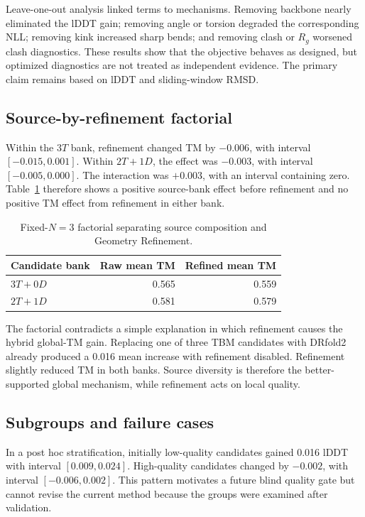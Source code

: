 \documentclass[12pt,a4paper,oneside]{report}
\begin{document}
Leave-one-out analysis linked terms to mechanisms. Removing backbone nearly eliminated
the lDDT gain; removing angle or torsion degraded the corresponding NLL; removing kink
increased sharp bends; and removing clash or $R_g$ worsened clash diagnostics. These
results show that the objective behaves as designed, but optimized diagnostics are not
treated as independent evidence. The primary claim remains based on lDDT and
sliding-window RMSD.

\subsection{Source-by-refinement factorial}

Within the $3T$ bank, refinement changed TM by $-0.006$, with interval
$[-0.015,0.001]$. Within $2T+1D$, the effect was $-0.003$, with interval
$[-0.005,0.000]$. The interaction was $+0.003$, with an interval containing
zero. Table~\ref{tab:factorial_en} therefore shows a positive source-bank effect before
refinement and no positive TM effect from refinement in either bank.

\begin{table}[H]
\centering
\caption{Fixed-$N=3$ factorial separating source composition and Geometry Refinement.}
\label{tab:factorial_en}
\begin{tabular}{lrr}
\toprule
Candidate bank & Raw mean TM & Refined mean TM \\
\midrule
$3T+0D$ & 0.565 & 0.559 \\
$2T+1D$ & 0.581 & 0.579 \\
\bottomrule
\end{tabular}
\end{table}

The factorial contradicts a simple explanation in which refinement causes the hybrid
global-TM gain. Replacing one of three TBM candidates with DRfold2 already produced a
0.016 mean increase with refinement disabled. Refinement slightly reduced TM in both
banks. Source diversity is therefore the better-supported global mechanism, while
refinement acts on local quality.

\subsection{Subgroups and failure cases}

In a post hoc stratification, initially low-quality candidates gained 0.016 lDDT with
interval $[0.009,0.024]$. High-quality candidates changed by $-0.002$, with interval
$[-0.006,0.002]$. This pattern motivates a future blind quality gate but
cannot revise the current method because the groups were examined after validation.
\end{document}
